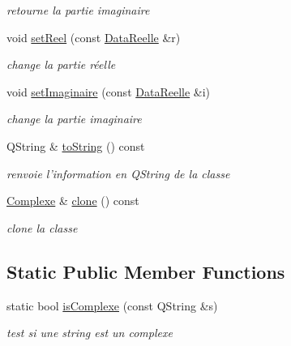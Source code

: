 \begin{DoxyCompactItemize}
\begin{DoxyCompactList}\small\item\em retourne la partie imaginaire \item\end{DoxyCompactList}\item 
void \hyperlink{classNombre_1_1Complexe_a498bde3887a4c785d51af6d64999f822}{setReel} (const \hyperlink{classNombre_1_1DataReelle}{DataReelle} \&r)
\begin{DoxyCompactList}\small\item\em change la partie réelle \item\end{DoxyCompactList}\item 
void \hyperlink{classNombre_1_1Complexe_af35fa6553144a161972f14d93c6ec954}{setImaginaire} (const \hyperlink{classNombre_1_1DataReelle}{DataReelle} \&i)
\begin{DoxyCompactList}\small\item\em change la partie imaginaire \item\end{DoxyCompactList}\item 
\hypertarget{classNombre_1_1Complexe_ab060a9a05c236ee293c85934702636cc}{
QString \& \hyperlink{classNombre_1_1Complexe_ab060a9a05c236ee293c85934702636cc}{toString} () const }
\label{classNombre_1_1Complexe_ab060a9a05c236ee293c85934702636cc}

\begin{DoxyCompactList}\small\item\em renvoie l'information en QString de la classe \item\end{DoxyCompactList}\item 
\hypertarget{classNombre_1_1Complexe_a40b54a55997c110e5e6b348374b33bf4}{
\hyperlink{classNombre_1_1Complexe}{Complexe} \& \hyperlink{classNombre_1_1Complexe_a40b54a55997c110e5e6b348374b33bf4}{clone} () const }
\label{classNombre_1_1Complexe_a40b54a55997c110e5e6b348374b33bf4}

\begin{DoxyCompactList}\small\item\em clone la classe \item\end{DoxyCompactList}\end{DoxyCompactItemize}
\subsection*{Static Public Member Functions}
\begin{DoxyCompactItemize}
\item 
static bool \hyperlink{classNombre_1_1Complexe_a6f932e9575a070a064868873d66962b8}{isComplexe} (const QString \&s)
\begin{DoxyCompactList}\small\item\em test si une string est un complexe \item\end{DoxyCompactList}\end{DoxyCompactItemize}


